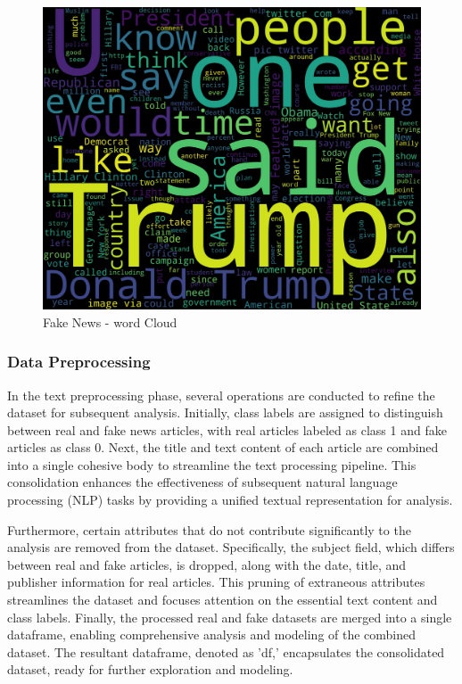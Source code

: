 \begin{figure}
    \centering
    \includegraphics[width=0.75\linewidth]{figures/fakenews_wordcloud.pdf}
    \caption{Fake News - word Cloud}
    \label{fig:enter-label}
\end{figure}


 
\subsubsection{{Data Preprocessing}}
 In the text preprocessing phase, several operations are conducted to refine the dataset for subsequent analysis. Initially, class labels are assigned to distinguish between real and fake news articles, with real articles labeled as class 1 and fake articles as class 0. Next, the title and text content of each article are combined into a single cohesive body to streamline the text processing pipeline. This consolidation enhances the effectiveness of subsequent natural language processing (NLP) tasks by providing a unified textual representation for analysis.

Furthermore, certain attributes that do not contribute significantly to the analysis are removed from the dataset. Specifically, the subject field, which differs between real and fake articles, is dropped, along with the date, title, and publisher information for real articles. This pruning of extraneous attributes streamlines the dataset and focuses attention on the essential text content and class labels. Finally, the processed real and fake datasets are merged into a single dataframe, enabling comprehensive analysis and modeling of the combined dataset. The resultant dataframe, denoted as 'df,' encapsulates the consolidated dataset, ready for further exploration and modeling.

